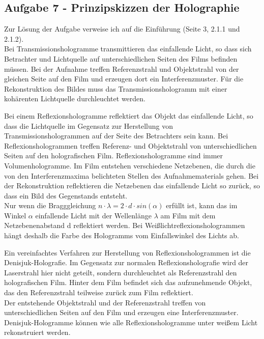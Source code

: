 \subsection*{Aufgabe 7 - Prinzipskizzen der Holographie}
Zur Lösung der Aufgabe verweise ich auf die Einführung (Seite 3, 2.1.1 und 2.1.2). \\
Bei Transmissionshologramme transmittieren das einfallende Licht, so dass sich Betrachter und Lichtquelle auf unterschiedlichen Seiten des Films befinden müssen. Bei der Aufnahme treffen Referenzstrahl und Objektstrahl von der gleichen Seite auf den Film und erzeugen dort ein Interferenzmuster. Für die Rekonstruktion des Bildes muss das Transmissionshologramm mit einer kohärenten Lichtquelle durchleuchtet werden.


Bei einem Reflexionshologramme reflektiert das Objekt das einfallende Licht, so dass die Lichtquelle im Gegensatz zur Herstellung von Transmissionshologrammen auf der Seite des Betrachters sein kann. Bei Reflexionshologrammen treffen Referenz- und Objektstrahl von unterschiedlichen Seiten auf den holografischen Film. Reflexionshologramme sind immer Volumenhologramme. Im Film entstehen verschiedene Netzebenen, die durch die von den Interferenzmaxima belichteten Stellen des Aufnahmematerials gehen. Bei der Rekonstruktion reflektieren die Netzebenen das einfallende Licht so zurück, so dass ein Bild des Gegenstands entsteht.\\
Nur wenn die Bragggleichung $n \cdot \lambda = 2 \cdot d \cdot sin \left( \alpha \right)$ erfüllt ist, kann das im Winkel $\alpha$ einfallende Licht mit der Wellenlänge $\lambda$ am Film mit dem Netzebenenabstand d reflektiert werden. Bei Weißlichtreflexionshologrammen hängt deshalb die Farbe des Hologramms vom Einfallswinkel des Lichts ab.


Ein vereinfachtes Verfahren zur Herstellung von Reflexionshologrammen ist die Denisjuk-Holografie. Im Gegensatz zur normalen Reflexionsholografie wird der Laserstrahl hier nicht geteilt, sondern durchleuchtet als Referenzstrahl den holografischen Film.
Hinter dem Film befindet sich das aufzunehmende Objekt, das den Referenzstrahl teilweise zurück zum Film reflektiert.\\
Der entstehende Objektstrahl und der Referenzstrahl treffen von unterschiedlichen Seiten auf den Film und erzeugen eine Interferenzmuster. Denisjuk-Hologramme können wie alle Reflexionshologramme unter weißem Licht rekonstruiert werden.

